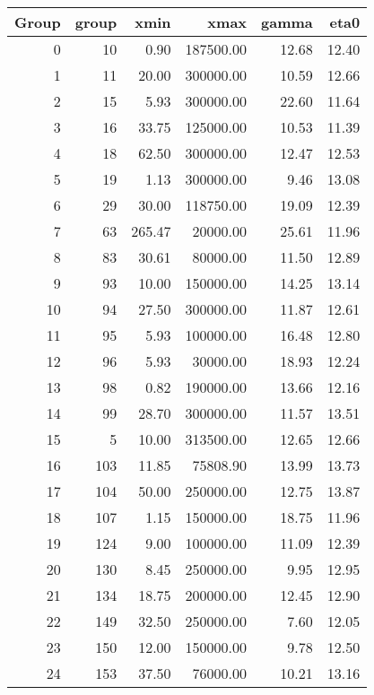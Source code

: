 \begin{tabular}{rrrrrr}
\toprule
 Group &  group &   xmin &      xmax &  gamma &  eta0 \\
\midrule
     0 &     10 &   0.90 & 187500.00 &  12.68 & 12.40 \\
     1 &     11 &  20.00 & 300000.00 &  10.59 & 12.66 \\
     2 &     15 &   5.93 & 300000.00 &  22.60 & 11.64 \\
     3 &     16 &  33.75 & 125000.00 &  10.53 & 11.39 \\
     4 &     18 &  62.50 & 300000.00 &  12.47 & 12.53 \\
     5 &     19 &   1.13 & 300000.00 &   9.46 & 13.08 \\
     6 &     29 &  30.00 & 118750.00 &  19.09 & 12.39 \\
     7 &     63 & 265.47 &  20000.00 &  25.61 & 11.96 \\
     8 &     83 &  30.61 &  80000.00 &  11.50 & 12.89 \\
     9 &     93 &  10.00 & 150000.00 &  14.25 & 13.14 \\
    10 &     94 &  27.50 & 300000.00 &  11.87 & 12.61 \\
    11 &     95 &   5.93 & 100000.00 &  16.48 & 12.80 \\
    12 &     96 &   5.93 &  30000.00 &  18.93 & 12.24 \\
    13 &     98 &   0.82 & 190000.00 &  13.66 & 12.16 \\
    14 &     99 &  28.70 & 300000.00 &  11.57 & 13.51 \\
    15 &      5 &  10.00 & 313500.00 &  12.65 & 12.66 \\
    16 &    103 &  11.85 &  75808.90 &  13.99 & 13.73 \\
    17 &    104 &  50.00 & 250000.00 &  12.75 & 13.87 \\
    18 &    107 &   1.15 & 150000.00 &  18.75 & 11.96 \\
    19 &    124 &   9.00 & 100000.00 &  11.09 & 12.39 \\
    20 &    130 &   8.45 & 250000.00 &   9.95 & 12.95 \\
    21 &    134 &  18.75 & 200000.00 &  12.45 & 12.90 \\
    22 &    149 &  32.50 & 250000.00 &   7.60 & 12.05 \\
    23 &    150 &  12.00 & 150000.00 &   9.78 & 12.50 \\
    24 &    153 &  37.50 &  76000.00 &  10.21 & 13.16 \\

\end{tabular}
